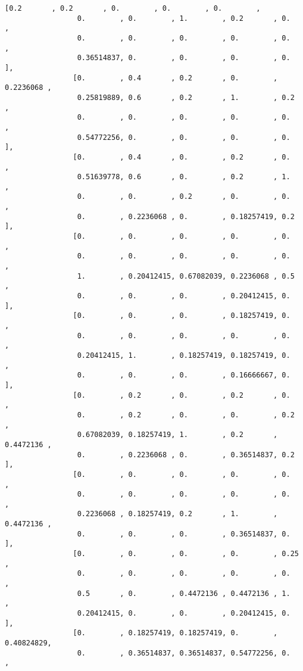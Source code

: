 \documentclass[11pt]{article}
\begin{document}
\begin{Verbatim}[commandchars=\\\{\}]
                [0.2       , 0.2       , 0.        , 0.        , 0.        ,
                 0.        , 0.        , 1.        , 0.2       , 0.        ,
                 0.        , 0.        , 0.        , 0.        , 0.        ,
                 0.36514837, 0.        , 0.        , 0.        , 0.        ],
                [0.        , 0.4       , 0.2       , 0.        , 0.2236068 ,
                 0.25819889, 0.6       , 0.2       , 1.        , 0.2       ,
                 0.        , 0.        , 0.        , 0.        , 0.        ,
                 0.54772256, 0.        , 0.        , 0.        , 0.        ],
                [0.        , 0.4       , 0.        , 0.2       , 0.        ,
                 0.51639778, 0.6       , 0.        , 0.2       , 1.        ,
                 0.        , 0.        , 0.2       , 0.        , 0.        ,
                 0.        , 0.2236068 , 0.        , 0.18257419, 0.2       ],
                [0.        , 0.        , 0.        , 0.        , 0.        ,
                 0.        , 0.        , 0.        , 0.        , 0.        ,
                 1.        , 0.20412415, 0.67082039, 0.2236068 , 0.5       ,
                 0.        , 0.        , 0.        , 0.20412415, 0.        ],
                [0.        , 0.        , 0.        , 0.18257419, 0.        ,
                 0.        , 0.        , 0.        , 0.        , 0.        ,
                 0.20412415, 1.        , 0.18257419, 0.18257419, 0.        ,
                 0.        , 0.        , 0.        , 0.16666667, 0.        ],
                [0.        , 0.2       , 0.        , 0.2       , 0.        ,
                 0.        , 0.2       , 0.        , 0.        , 0.2       ,
                 0.67082039, 0.18257419, 1.        , 0.2       , 0.4472136 ,
                 0.        , 0.2236068 , 0.        , 0.36514837, 0.2       ],
                [0.        , 0.        , 0.        , 0.        , 0.        ,
                 0.        , 0.        , 0.        , 0.        , 0.        ,
                 0.2236068 , 0.18257419, 0.2       , 1.        , 0.4472136 ,
                 0.        , 0.        , 0.        , 0.36514837, 0.        ],
                [0.        , 0.        , 0.        , 0.        , 0.25      ,
                 0.        , 0.        , 0.        , 0.        , 0.        ,
                 0.5       , 0.        , 0.4472136 , 0.4472136 , 1.        ,
                 0.20412415, 0.        , 0.        , 0.20412415, 0.        ],
                [0.        , 0.18257419, 0.18257419, 0.        , 0.40824829,
                 0.        , 0.36514837, 0.36514837, 0.54772256, 0.        ,

\end{Verbatim}
\end{document}

